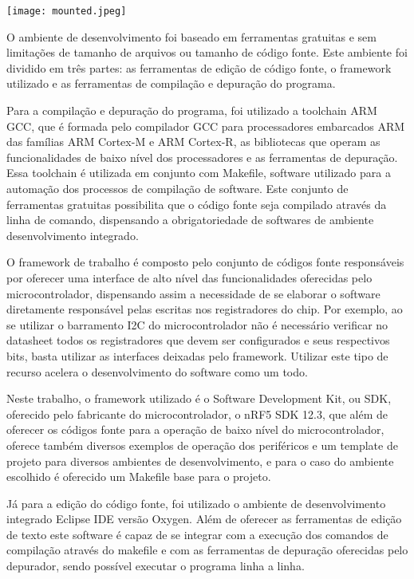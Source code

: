 \begin{center}
	\centering 
	\texttt{[image: mounted.jpeg]} 
	\label{fig:mounted_proj}
\end{center} 



O ambiente de desenvolvimento foi baseado em ferramentas gratuitas e sem
limitações de tamanho de arquivos ou tamanho de código fonte. Este ambiente foi
dividido em três partes: as ferramentas de edição de código fonte, o framework
utilizado e as ferramentas de compilação e depuração do programa.

Para a compilação e depuração do programa, foi utilizado a toolchain ARM GCC,
que é formada pelo compilador GCC para processadores embarcados ARM das famílias
ARM Cortex-M e ARM Cortex-R, as bibliotecas que operam as funcionalidades de
baixo nível dos processadores e as ferramentas de depuração. Essa toolchain é
utilizada em conjunto com Makefile, software utilizado para a automação dos
processos de compilação de software. Este conjunto de ferramentas gratuitas
possibilita que o código fonte seja compilado através da linha de comando,
dispensando a obrigatoriedade de softwares de ambiente desenvolvimento
integrado.

O framework de trabalho é composto pelo conjunto de códigos fonte responsáveis
por oferecer uma interface de alto nível das funcionalidades oferecidas pelo
microcontrolador, dispensando assim a necessidade de se elaborar o software
diretamente responsável pelas escritas nos registradores do chip. Por exemplo,
ao se utilizar o barramento I2C do microcontrolador não é necessário verificar
no datasheet todos os registradores que devem ser configurados e seus
respectivos bits, basta utilizar as interfaces deixadas pelo framework. Utilizar
este tipo de recurso acelera o desenvolvimento do software como um todo.

Neste trabalho, o framework utilizado é o Software Development Kit, ou SDK,
oferecido pelo fabricante do microcontrolador, o nRF5 SDK 12.3, que além de
oferecer os códigos fonte para a operação de baixo nível do microcontrolador,
oferece também diversos exemplos de operação dos periféricos e um template de
projeto para diversos ambientes de desenvolvimento, e para o caso do ambiente
escolhido é oferecido um Makefile base para o projeto.

Já para a edição do código fonte, foi utilizado o ambiente de desenvolvimento
integrado Eclipse IDE versão Oxygen. Além de oferecer as ferramentas de edição
de texto este software é capaz de se integrar com a execução dos comandos de
compilação através do makefile e com as ferramentas de depuração oferecidas pelo
depurador, sendo possível executar o programa linha a linha.

